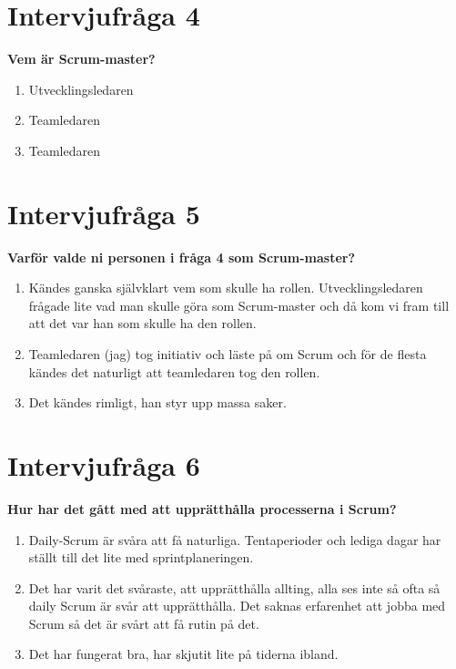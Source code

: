 \section{Intervjufråga 4}
\textbf{Vem är Scrum-master?}
\begin{enumerate}
\item Utvecklingsledaren
\item Teamledaren
\item Teamledaren
\end{enumerate}

\section{Intervjufråga 5}
\textbf{Varför valde ni personen i fråga 4 som Scrum-master?}
\begin{enumerate}
\item Kändes ganska självklart vem som skulle ha rollen. Utvecklingsledaren frågade lite vad man skulle göra som Scrum-master och då kom vi fram till att det var han som skulle ha den rollen.
\item Teamledaren (jag) tog initiativ och läste på om Scrum och för de flesta kändes det naturligt att teamledaren tog den rollen. 
\item Det kändes rimligt, han styr upp massa saker.
\end{enumerate}

\section{Intervjufråga 6}
\textbf{Hur har det gått med att upprätthålla processerna i Scrum?}
\begin{enumerate}
\item Daily-Scrum är svåra att få naturliga. Tentaperioder och lediga dagar har ställt till det lite med sprintplaneringen.
\item Det har varit det svåraste, att upprätthålla allting, alla ses inte så ofta så daily Scrum är svår att upprätthålla. Det saknas erfarenhet att jobba med Scrum så det är svårt att få rutin på det.
\item Det har fungerat bra, har skjutit lite på tiderna ibland.
\end{enumerate}

